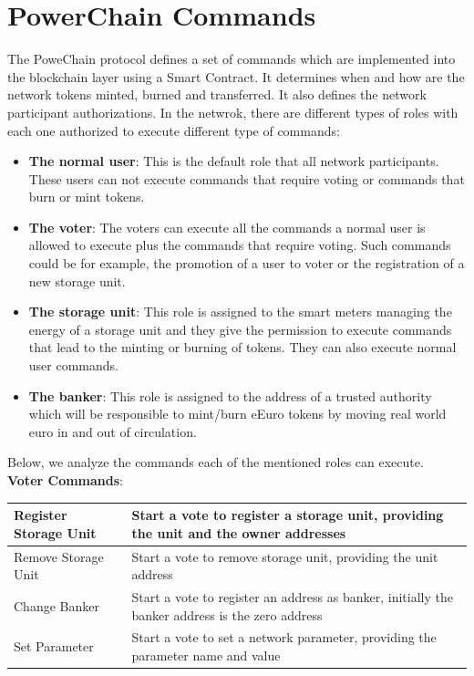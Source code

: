 \section{PowerChain Commands}
The PoweChain protocol defines a set of commands which are implemented into the blockchain layer using a Smart Contract. It determines when and how are the network tokens minted, burned and transferred. 
It also defines the network participant authorizations. In the netwrok, there are different types of roles with each one authorized to execute different type of commands:
\begin{itemize}
    \item \textbf{The normal user}: This is the default role that all network participants. These users can not execute commands that require voting or commands that burn or mint tokens.
    \item \textbf{The voter}: The voters can execute all the commands a normal user is allowed to execute plus the commands that require voting. Such commands could be for example, the promotion of a user to voter
    or the registration of a new storage unit.
    \item \textbf{The storage unit}: This role is assigned to the smart meters managing the energy of a storage unit and they give the permission to execute commands that lead to the minting or burning of tokens. They
    can also execute normal user commands.
    \item \textbf{The banker}: This role is assigned to the address of a trusted authority which will be responsible to mint/burn eEuro tokens by moving real world euro in and out of circulation.
\end{itemize}
Below, we analyze the commands each of the mentioned roles can execute.\\
\textbf{Voter Commands}:\\
\begin{tabular}{|p{5.5cm}|p{8cm}|}
    \hline
    Register Storage Unit & Start a vote to register a storage unit, providing the unit and the owner addresses \\ \hline
    Remove Storage Unit & Start a vote to remove storage unit, providing the unit address \\ \hline
    Change Banker & Start a vote to register an address as banker, initially the banker address is the zero address \\ \hline
    Set Parameter & Start a vote to set a network parameter, providing the parameter name and value \\ \hline
\end{tabular}\\

